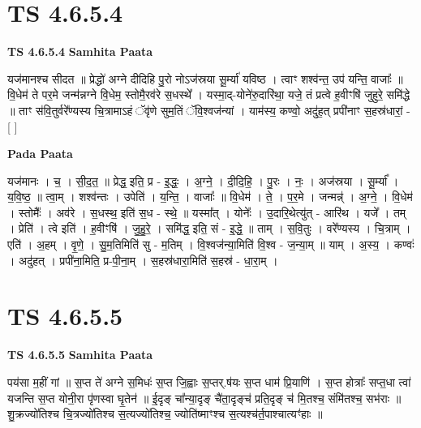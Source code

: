 \documentclass[17pt]{extarticle}
\begin{document}
\section*{ TS 4.6.5.4 }

\textbf{TS 4.6.5.4 } \newline
\textbf{Samhita Paata} \newline

यज॑मानश्च सीदत ॥ प्रेद्धो॑ अग्ने दीदिहि पु॒रो नोऽज॑स्रया सू॒र्म्या॑ यविष्ठ । त्वाꣳ शश्व॑न्त॒ उप॑ यन्ति॒ वाजाः᳚ ॥ वि॒धेम॑ ते पर॒मे जन्म॑न्नग्ने वि॒धेम॒ स्तोमै॒रव॑रे स॒धस्थे᳚ । यस्मा॒द्-योने॑रु॒दारि॑था॒ यजे॒ तं प्रत्वे ह॒वीꣳषि॑ जुहुरे॒ समि॑द्धे ॥ ताꣳ स॑वि॒तुर्वरे᳚ण्यस्य चि॒त्रामाऽहं ॅवृ॑णे सुम॒तिं ॅवि॒श्वज॑न्यां । याम॑स्य॒ कण्वो॒ अदु॑ह॒त् प्रपी॑नाꣳ स॒हस्र॑धारां॒ - [  ] \newline

\textbf{Pada Paata} \newline

यज॑मानः । च॒ । सी॒द॒त॒ ॥ प्रेद्ध॒ इति॒ प्र - इ॒द्धः॒ । अ॒ग्ने॒ । दी॒दि॒हि॒ । पु॒रः । नः॒ । अज॑स्रया । सू॒र्म्या᳚ । य॒वि॒ष्ठ॒ ॥ त्वा॒म् । शश्व॑न्तः । उपेति॑ । य॒न्ति॒ । वाजाः᳚ ॥ वि॒धेम॑ । ते॒ । प॒र॒मे । जन्मन्न्॑ । अ॒ग्ने॒ । वि॒धेम॑ । स्तोमैः᳚ । अव॑रे । स॒धस्थ॒ इति॑ स॒ध - स्थे॒ ॥ यस्मा᳚त् । योनेः᳚ । उ॒दारि॒थेत्यु॑त् - आरि॑थ । यजे᳚ । तम् । प्रेति॑ । त्वे इति॑ । ह॒वीꣳषि॑ । जु॒हु॒रे॒ । समि॑द्ध॒ इति॒ सं - इ॒द्धे॒ ॥ ताम् । स॒वि॒तुः । वरे᳚ण्यस्य । चि॒त्राम् । एति॑ । अ॒हम् । वृ॒णे॒ । सु॒म॒तिमिति॑ सु - म॒तिम् । वि॒श्वज॑न्या॒मिति॑ वि॒श्व - ज॒न्या॒म् ॥ याम् । अ॒स्य॒ । कण्वः॑ । अदु॑हत् । प्रपी॑ना॒मिति॒ प्र-पी॒ना॒म् । स॒हस्र॑धारा॒मिति॑ स॒हस्र॑ - धा॒रा॒म् ।  \newline




\section*{ TS 4.6.5.5 }

\textbf{TS 4.6.5.5 } \newline
\textbf{Samhita Paata} \newline

पय॑सा म॒हीं गां ॥ स॒प्त ते॑ अग्ने स॒मिधः॑ स॒प्त जि॒ह्वाः स॒प्तर्.ष॑यः स॒प्त धाम॑ प्रि॒याणि॑ । स॒प्त होत्राः᳚ सप्त॒धा त्वा॑ यजन्ति स॒प्त योनी॒रा पृ॑णस्वा घृ॒तेन॑ ॥ ई॒दृङ् चा᳚न्या॒दृङ् चै॑ता॒दृङ्च॑ प्रति॒दृङ् च॑ मि॒तश्च॒ संमि॑तश्च॒ सभ॑राः ॥ शु॒क्रज्यो॑तिश्च चि॒त्रज्यो॑तिश्च स॒त्यज्यो॑तिश्च॒ ज्योति॑ष्माꣳश्च स॒त्यश्च॑र्त॒पाश्चात्यꣳ॑हाः ॥ \newline
\end{document}

